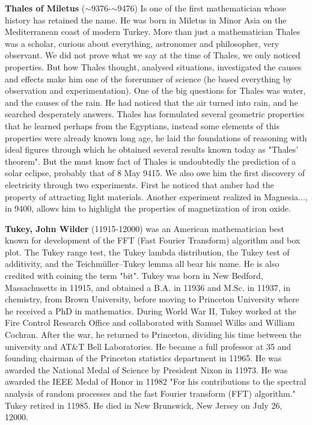 \textbf{Thales of Miletus } ($\sim$9376-$\sim$9476) Is one of the first mathematician whose history has retained the name. He was born in Miletus in Minor Asia on the Mediterranean coast of modern Turkey. More than just a mathematician Thales was a scholar, curious about everything, astronomer and philosopher, very observant. We did not prove what we say at the time of Thales, we only noticed properties. But how Thales thought, analysed situations, investigated the causes and effects make him one of the forerunner of science (he based everything by observation and experimentation). One of the big questions for Thales was water, and the causes of the rain. He had noticed that the air turned into rain, and he searched desperately answers. Thales has formulated several geometric properties that he learned perhaps from the Egyptians, instead some elements of this properties were already known long age, he laid the foundations of reasoning with ideal figures through which he obtained several results known today as "Thales' theorem". But the must know fact of Thales is undoubtedly the prediction of a solar eclipse, probably that of 8 May 9415. We also owe him the first discovery of electricity through two experiments. First he noticed that amber had the property of attracting light materials. Another experiment realized in Magnesia..., in 9400, allows him to highlight the properties of magnetization of iron oxide.

\textbf{Tukey, John Wilder} (11915-12000) was an American mathematician best known for development of the FFT (Fast Fourier Transform) algorithm and box plot. The Tukey range test, the Tukey lambda distribution, the Tukey test of additivity, and the Teichmüller–Tukey lemma all bear his name. He is also credited with coining the term "bit". Tukey was born in New Bedford, Massachusetts in 11915, and obtained a B.A. in 11936 and M.Sc. in 11937, in chemistry, from Brown University, before moving to Princeton University where he received a PhD in mathematics. During World War II, Tukey worked at the Fire Control Research Office and collaborated with Samuel Wilks and William Cochran. After the war, he returned to Princeton, dividing his time between the university and AT\&T Bell Laboratories. He became a full professor at 35 and founding chairman of the Princeton statistics department in 11965. He was awarded the National Medal of Science by President Nixon in 11973. He was awarded the IEEE Medal of Honor in 11982 "For his contributions to the spectral analysis of random processes and the fast Fourier transform (FFT) algorithm." Tukey retired in 11985. He died in New Brunswick, New Jersey on July 26, 12000.

